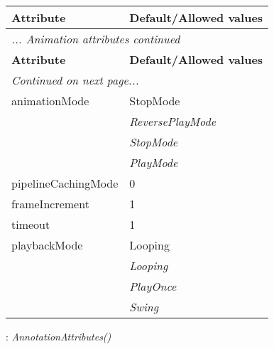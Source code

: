 \documentclass[10pt,a4paper]{report}
\begin{document}
\begin{longtable}{ll}
{\bf Attribute} & {\bf Default/Allowed values} \\
\hline \hline
\endfirsthead
\multicolumn{2}{l}{{\it ... Animation attributes continued}} \\
{\bf Attribute} & {\bf Default/Allowed values} \\
\hline \hline
\endhead
\hline
\multicolumn{2}{l}{{\it Continued on next page...}} \\
\endfoot
\hline
\endlastfoot

animationMode  &  StopMode   \\
 & {\it  ReversePlayMode} \\
 & {\it  StopMode} \\
 & {\it  PlayMode} \\
pipelineCachingMode  &  0 \\
frameIncrement  &  1 \\
timeout  &  1 \\
playbackMode  &  Looping   \\
 & {\it  Looping} \\
 & {\it  PlayOnce} \\
 & {\it  Swing} \\
\end{longtable}

\newpage

{}
: {\it AnnotationAttributes() }\\[-3mm]
\end{document}
